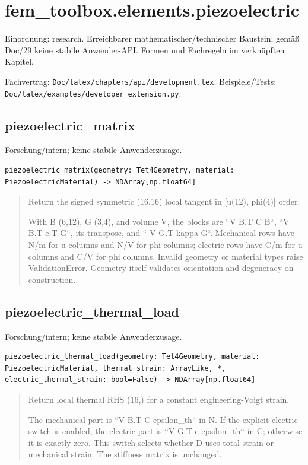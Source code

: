 \section{fem\_toolbox.elements.piezoelectric}
Einordnung: research. Erreichbarer mathematischer/technischer Baustein; gemäß Doc/29 keine stabile Anwender-API. Formen und Fachregeln im verknüpften Kapitel.
\par Fachvertrag: \nolinkurl{Doc/latex/chapters/api/development.tex}. Beispiele/Tests:
\nolinkurl{Doc/latex/examples/developer_extension.py}.
\subsection{piezoelectric\_matrix}
Forschung/intern; keine stabile Anwenderzusage.
\begin{lstlisting}
piezoelectric_matrix(geometry: Tet4Geometry, material: PiezoelectricMaterial) -> NDArray[np.float64]
\end{lstlisting}
\begin{quote}
Return the signed symmetric (16,16) local tangent in [u(12), phi(4)] order.\par With B (6,12), G (3,4), and volume V, the blocks are ``V B.T C B``, ``V B.T e.T G``, its transpose, and ``-V G.T kappa G``. Mechanical rows have N/m for u columns and N/V for phi columns; electric rows have C/m for u columns and C/V for phi columns. Invalid geometry or material types raise ValidationError. Geometry itself validates orientation and degeneracy on construction.
\end{quote}
\subsection{piezoelectric\_thermal\_load}
Forschung/intern; keine stabile Anwenderzusage.
\begin{lstlisting}
piezoelectric_thermal_load(geometry: Tet4Geometry, material: PiezoelectricMaterial, thermal_strain: ArrayLike, *, electric_thermal_strain: bool=False) -> NDArray[np.float64]
\end{lstlisting}
\begin{quote}
Return local thermal RHS (16,) for a constant engineering-Voigt strain.\par The mechanical part is ``V B.T C epsilon\_th`` in N. If the explicit electric switch is enabled, the electric part is ``V G.T e epsilon\_th`` in C; otherwise it is exactly zero. This switch selects whether D uses total strain or mechanical strain. The stiffness matrix is unchanged.
\end{quote}
